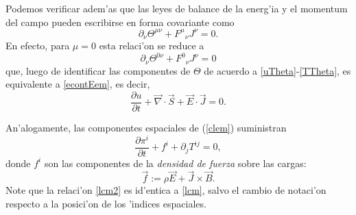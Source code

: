 
Podemos verificar adem'as que las leyes de balance de la energ'ia y el momentum del campo pueden escribirse en forma covariante como
\begin{equation}
\boxed{\partial_\nu \Theta^{\mu\nu}+ F^\mu{}_\nu J^\nu=0.}
\label{clem}
\end{equation}
En efecto, para $\mu=0$ esta relaci'on se reduce a
\begin{equation}
\partial_\nu \Theta^{0\nu}+F^0{}_\nu J^\nu=0
\end{equation}
que, luego de identificar las componentes de $\Theta$ de acuerdo a \eqref{uTheta}-\eqref{TTheta}, es equivalente a \eqref{econtEem}, es decir,
\begin{equation}
\frac{\partial u}{\partial
t}+\vec{\nabla}\cdot\vec{S}+\vec{E}\cdot\vec{J}  =0.
\end{equation}

An'alogamente, las componentes espaciales de (\ref{clem}) suministran
\begin{equation}\label{lcm2}
\frac{\partial \pi^i}{\partial t}+f^i  +\partial_jT^{ij}=0,
\end{equation}
donde $f^i$ son las componentes de la \textit{densidad de fuerza} sobre las cargas:
\begin{equation}
\vec{f} :=\rho \vec{E}  +\vec{J}\times \vec{B}.
\end{equation}
Note que la relaci'on \eqref{lcm2} es id'entica a \eqref{lcm}, salvo el cambio de notaci'on respecto a la posici'on de los 'indices espaciales.



